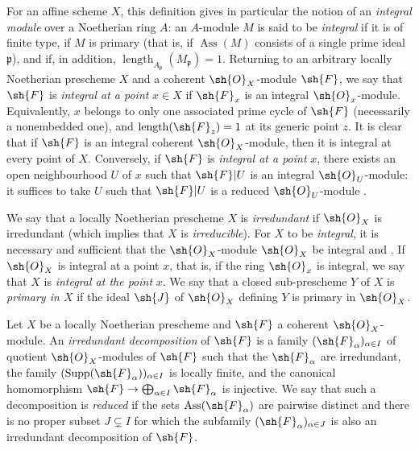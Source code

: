 For an affine scheme $X$, this definition gives in particular the notion of an \emph{integral module} over a Noetherian ring $A$: an $A$-module $M$ is said to be \emph{integral} if it is of finite type, if $M$ is primary (that is, if $\operatorname{Ass}(M)$ consists of a single prime ideal $\mathfrak{p}$), and if, in addition, $\operatorname{length}_{A_\mathfrak{p}}(M_\mathfrak{p})=1$.
Returning to an arbitrary locally Noetherian prescheme $X$ and a coherent $\sh{O}_X$-module $\sh{F}$, we say that $\sh{F}$ is \emph{integral at a point} $x\in X$ if $\sh{F}_x$ is an integral $\sh{O}_x$-module.  Equivalently, $x$ belongs to only one associated prime cycle of $\sh{F}$ (necessarily a nonembedded one), and $\operatorname{length}(\sh{F}_z)=1$ at its generic point $z$.
It is clear that if $\sh{F}$ is an integral coherent $\sh{O}_X$-module, then it is integral at every point of $X$.  Conversely, if $\sh{F}$ is \emph{integral at a point} $x$, there exists an open neighbourhood $U$ of $x$ such that $\sh{F}|U$ is an integral $\sh{O}_U$-module: it suffices to take $U$ such that $\sh{F}|U$ is a reduced $\sh{O}_U$-module .


We say that a locally Noetherian prescheme $X$ is \emph{irredundant} if $\sh{O}_X$ is irredundant (which implies that $X$ is \emph{irreducible}).  For $X$ to be \emph{integral}, it is necessary and sufficient that the $\sh{O}_X$-module $\sh{O}_X$ be integral  and .
If $\sh{O}_X$ is integral at a point $x$, that is, if the ring $\sh{O}_x$ is integral, we say that $X$ is \emph{integral at the point} $x$.
We say that a closed sub-prescheme $Y$ of $X$ is \emph{primary in $X$} if the ideal $\sh{J}$ of $\sh{O}_X$ defining $Y$ is primary in $\sh{O}_X$.

\begin{definition}[3.2.5]
\label{IV.3.2.5}
Let $X$ be a locally Noetherian prescheme and $\sh{F}$ a coherent $\sh{O}_X$-module.
An \emph{irredundant decomposition} of $\sh{F}$ is a family $(\sh{F}_\alpha)_{\alpha\in I}$ of quotient $\sh{O}_X$-modules of $\sh{F}$ such that the $\sh{F}_\alpha$ are irredundant, the family $(\operatorname{Supp}(\sh{F}_\alpha))_{\alpha\in I}$ is locally finite, and the canonical homomorphism $\sh{F}\to\bigoplus_{\alpha\in I}\sh{F}_\alpha$ is injective.
We say that such a decomposition is \emph{reduced} if the sets $\operatorname{Ass}(\sh{F}_\alpha)$ are pairwise distinct and there is no proper subset $J\subsetneq I$ for which the subfamily $(\sh{F}_\alpha)_{\alpha\in J}$ is also an irredundant decomposition of $\sh{F}$.
\end{definition}

